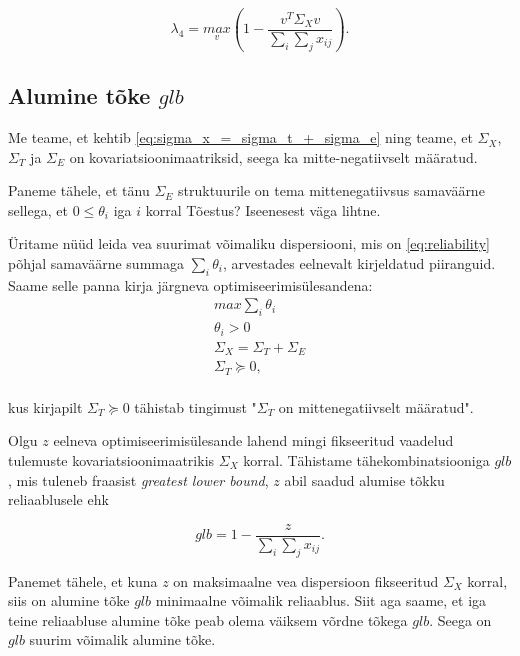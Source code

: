 \documentclass[a4paper,12pt]{article}
\numberwithin{equation}{section}
\theoremstyle{definition}
\begin{document}
\begin{equation*}
\lambda_4  = \underset{v}{max} \left( 1 - \frac{v^{T} \Sigma_X v}{\sum_i \sum_j x_{ij}} \right).
\end{equation*}


\subsection{Alumine tõke $glb$}

Me teame, et kehtib \eqref{eq:sigma_x_=_sigma_t_+_sigma_e} ning teame, et $\Sigma_X$, $\Sigma_T$ ja $\Sigma_E$ on kovariatsioonimaatriksid, seega ka mitte-negatiivselt määratud.

Paneme tähele, et tänu $\Sigma_E$ struktuurile on tema mittenegatiivsus samaväärne sellega, et $0 \leq \theta_i$ iga $i$ korral {\color{cyan} Tõestus? Iseenesest väga lihtne}. 

\"Uritame n\"u\"ud  leida vea suurimat võimaliku dispersiooni, mis on \eqref{eq:reliability} põhjal samaväärne summaga $\sum_i \theta_i$, arvestades eelnevalt kirjeldatud piiranguid. Saame selle panna kirja järgneva optimiseerimis\"ulesandena:
\begin{equation}
\begin{gathered}
max \sum_i \theta_i \\
\theta_i > 0 \\
\Sigma_X = \Sigma_T + \Sigma_E \\
\Sigma_T \succeq 0, \\
\end{gathered} 
\end{equation} 

kus kirjapilt $\Sigma_T \succeq 0$ tähistab tingimust "$\Sigma_T$ on mittenegatiivselt määratud". 

Olgu $z$ eelneva optimiseerimis\"ulesande lahend mingi fikseeritud vaadelud tulemuste kovariatsioonimaatrikis $\Sigma_X$ korral. Tähistame tähekombinatsiooniga $glb$, mis tuleneb fraasist \textit{greatest lower bound}, $z$ abil saadud alumise tõkku reliaablusele ehk

\begin{equation*}
glb = 1 - \frac{z}{\sum_i \sum_j x_{ij}}.
\end{equation*}  

Panemet tähele, et kuna $z$ on maksimaalne vea dispersioon fikseeritud $\Sigma_X$ korral, siis on alumine tõke $glb$ minimaalne võimalik reliaablus. Siit aga saame, et iga teine reliaabluse alumine tõke peab olema väiksem võrdne tõkega $glb$. Seega on $glb$ suurim võimalik alumine tõke. 
\end{document}
